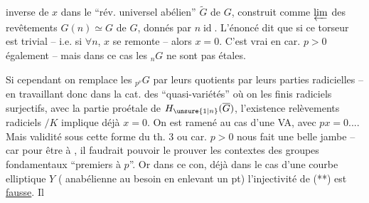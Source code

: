 inverse de $x$ dans le ``rév. universel abélien'' $\widetilde G$ de $G$, construit comme $\varprojlim$ des revêtements $G(n)\simeq G$ de $G$, donnés par $n\operatorname{id}$. L'énoncé dit que si ce torseur est trivial -- i.e. si $\forall n$, $x$ se remonte -- alors $x=0$. C'est vrai en car. $p>0$ également -- mais dans ce cas les ${}_nG$ ne sont pas étales.


Si cependant on remplace les ${}_{p^\nu}G$ par leurs quotients par leurs parties radicielles -- en travaillant donc dans la cat. des ``quasi-variétés'' où on   les   finis radiciels surjectifs,   avec la partie proétale de $H_{\unsure{1|n}}(\overline G)$,  l'existence  relèvements radiciels $/K$ implique déjà $x=0$.  On est ramené au cas d'une VA, avec $px=0$.... Mais  validité sous cette forme du th. 3 ou  car. $p>0$ nous fait une belle jambe -- car pour être à , il faudrait pouvoir le prouver   les contextes des groupes fondamentaux ``premiers à $p$''. Or dans ce con, déjà dans le cas d'une courbe elliptique $Y$ (  anabélienne au besoin en enlevant un pt) l'injectivité de (**) est \uline{fausse}. Il

